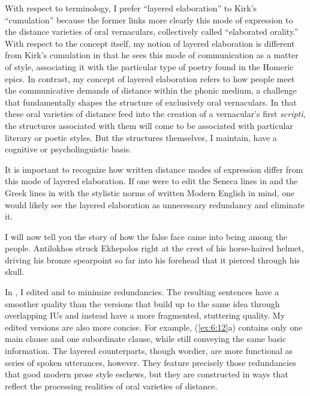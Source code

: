 With respect to terminology, I prefer “layered elaboration” to Kirk’s “cumulation” because the former links more clearly this mode of expression to the distance varieties of oral vernaculars, collectively called “elaborated orality.” With respect to the concept itself, my notion of layered elaboration is different from Kirk’s cumulation in that he sees this mode of communication as a matter of style, associating it with the particular type of poetry found in the Homeric epics. In contrast, my concept of layered elaboration refers to how people meet the communicative demands of distance within the phonic medium, a challenge that fundamentally shapes the structure of exclusively oral vernaculars. In that these oral varieties of distance feed into the creation of a vernacular’s first \textit{scripti}, the structures associated with them will come to be associated with particular literary or poetic styles. But the structures themselves, I maintain, have a cognitive or psycholinguistic basis.

It is important to recognize how written distance modes of expression differ from this mode of layered elaboration. If one were to edit the Seneca lines in  and the Greek lines in  with the stylistic norms of written Modern English in mind, one would likely see the layered elaboration as unnecessary redundancy and eliminate it.

\ea%
\label{ex:6:12}
  \ea I will now tell you the story of how the false face came into being among the people.
  \ex Antilokhos struck Ekhepolos right at the crest of his horse-haired helmet, driving his bronze spearpoint so far into his forehead that it pierced through his skull.
\z
\z

\noindent In , I edited  and  to minimize redundancies. The resulting sentences have a smoother quality than the versions that build up to the same idea through overlapping IUs and instead have a more fragmented, stuttering quality. My edited versions are also more concise. For example, (\ref{ex:6:12}a) contains only one main clause and one subordinate clause, while still conveying the same basic information. The layered counterparts, though wordier, are more functional as series of spoken utterances, however. They feature precisely those redundancies that good modern prose style eschews, but they are constructed in ways that reflect the processing realities of oral varieties of distance.

